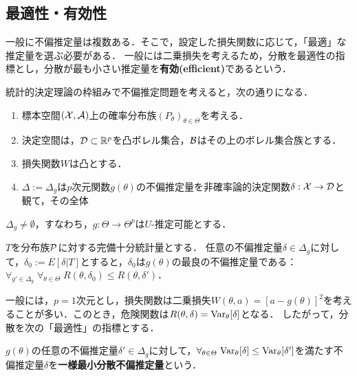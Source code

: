 \documentclass[uplatex,dvipdfmx]{jsreport}
\begin{document}
\subsection{最適性・有効性}

\begin{tcolorbox}[colframe=ForestGreen, colback=ForestGreen!10!white,breakable,colbacktitle=ForestGreen!40!white,coltitle=black,fonttitle=\bfseries\sffamily,
title=]
    一般に不偏推定量は複数ある．そこで，設定した損失関数に応じて，「最適」な推定量を選ぶ必要がある．
    一般には二乗損失を考えるため，分散を最適性の指標とし，分散が最も小さい推定量を\textbf{有効(efficient)}であるという．
\end{tcolorbox}

\begin{notation}
    統計的決定理論の枠組みで不偏推定問題を考えると，次の通りになる．
    \begin{enumerate}
        \item 標本空間$(\X,\A)$上の確率分布族$(P_\theta)_{\theta\in\Theta}$を考える．
        \item 決定空間は，$\D\subset\R^p$を凸ボレル集合，$\B$はその上のボレル集合族とする．
        \item 損失関数$W$は凸とする．
        \item $\Delta:=\Delta_g$は$p$次元関数$g(\theta)$の不偏推定量を非確率論的決定関数$\delta:\X\to\D$と観て，その全体
    \end{enumerate}
    $\Delta_g\ne\emptyset$，すなわち，$g:\Theta\to\Theta^p$は$U$-推定可能とする．
\end{notation}

\begin{theorem}
    $T$を分布族$\P$に対する完備十分統計量とする．
    任意の不偏推定量$\delta\in\Delta_g$に対して，$\delta_0:=E[\delta|T]$とすると，$\delta_0$は$g(\theta)$の最良の不偏推定量である：$\forall_{g'\in\Delta_g}\;\forall_{\theta\in\Theta}\;R(\theta,\delta_0)\le R(\theta,\delta')$．
\end{theorem}
\begin{remarks}
    一般には，$p=1$次元とし，損失関数は二乗損失$W(\theta,a)=[a-g(\theta)]^2$を考えることが多い．このとき，危険関数は$R(\theta,\delta)=\Var_\theta[\delta]$となる．
    したがって，分散を次の「最適性」の指標とする．
\end{remarks}

\begin{definition}
    $g(\theta)$の任意の不偏推定量$\delta'\in\Delta_g$に対して，$\forall_{\theta\in\Theta}\;\Var_\theta[\delta]\le\Var_\theta[\delta']$を満たす不偏推定量$\delta$を\textbf{一様最小分散不偏推定量}という．
\end{definition}
\end{document}
